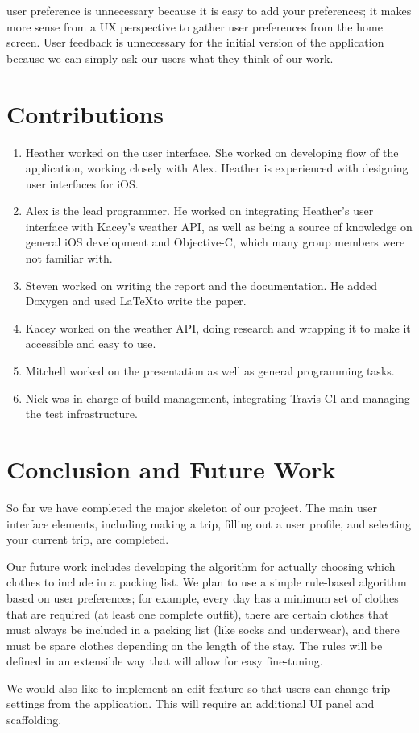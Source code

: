 \documentclass[11pt]{article}
\begin{document}
user preference is unnecessary because it is easy to add your preferences; it makes more sense from a UX perspective to gather user preferences from the home screen. User feedback is unnecessary for the initial version of the application because we can simply ask our users what they think of our work.

% 

\section{Contributions}
\begin{enumerate}
\item Heather worked on the user interface. She worked on developing flow of the application, working closely with Alex. Heather is experienced with designing user interfaces for iOS.
\item Alex is the lead programmer. He worked on integrating Heather's user interface with Kacey's weather API, as well as being a source of knowledge on general iOS development and Objective-C, which many group members were not familiar with.
\item Steven worked on writing the report and the documentation. He added Doxygen and used \LaTeX to write the paper. 
\item Kacey worked on the weather API, doing research and wrapping it to make it accessible and easy to use. 
\item Mitchell worked on the presentation as well as general programming tasks.
\item Nick was in charge of build management, integrating Travis-CI and managing the test infrastructure.
\end{enumerate}

\section{Conclusion and Future Work}
So far we have completed the major skeleton of our project. The main user interface elements, including making a trip, filling out a user profile, and selecting your current trip, are completed. 

Our future work includes developing the algorithm for actually choosing which clothes to include in a packing list. We plan to use a simple rule-based algorithm based on user preferences; for example, every day has a minimum set of clothes that are required (at least one complete outfit), there are certain clothes that must always be included in a packing list (like socks and underwear), and there must be spare clothes depending on the length of the stay. The rules will be defined in an extensible way that will allow for easy fine-tuning.

We would also like to implement an edit feature so that users can change trip settings from the application. This will require an additional UI panel and scaffolding.
\end{document}
